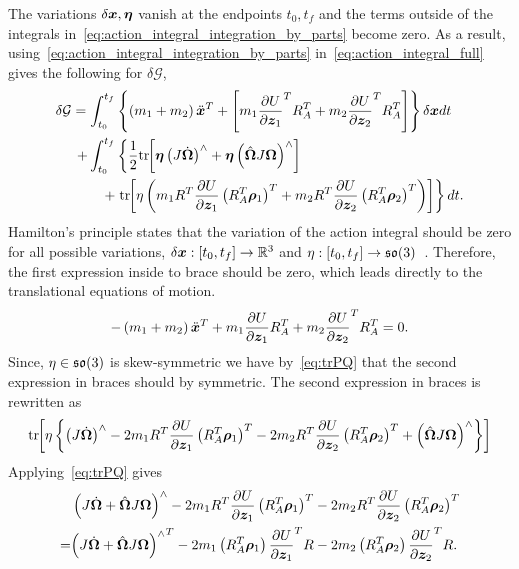 The variations \( \delta \bm{x}, \bm{\eta}\) vanish at the endpoints \( t_0, t_f \) and the terms outside of the integrals in~\cref{eq:action_integral_integration_by_parts} become zero.
As a result, using~\cref{eq:action_integral_integration_by_parts} in~\cref{eq:action_integral_full} gives the following for \( \delta \mathcal{G} \),
\begin{align}\label{eq:action_integral_stationary}
    \delta \mathcal{G} = \int_{t_0}^{t_f} & \left\{  \left( m_1 + m_2 \right) \ddot{\bm{x}}^T + \left[ m_1 \frac{\partial U}{\partial \bm{z}_1}^T R_A^T + m_2 \frac{\partial U}{\partial \bm{z}_2}^T R_A^T  \right] \right\} \delta\bm{x} dt \nonumber\\
    + \int_{t_0}^{t_f} &\left\{ \frac{1}{2} \mathrm{tr}\negthickspace\left[ \bm{\eta} \left( J \dot{\bm{\Omega}} \right)^\wedge + \bm{\eta} \left( \hat{\bm{\Omega}} J \bm{\Omega} \right)^\wedge  \right] \right. \nonumber \\
    + & \left.  \mathrm{tr}\negthickspace\left[  \eta \left( m_1 R^T \frac{\partial U}{\partial \bm{z}_1} \left( R_A^T \bm{\rho}_1 \right)^T + m_2 R^T \frac{\partial U}{\partial \bm{z}_2} \left( R_A^T \bm{\rho}_2 \right)^T \right) \right] \right\} dt.
\end{align}
Hamilton's principle states that the variation of the action integral should be zero for all possible variations, \( \delta \bm{x} : \left[ t_0, t_f \right] \to \mathbb{R}^3 \) and \( \eta : \left[ t_0, t_f \right] \to \mathfrak{so}(3) \)~\cite{lanczos1970}.
Therefore, the first expression inside to brace should be zero, which leads directly to the translational equations of motion.
\begin{align}\label{eq:translational_eoms}
    -\left( m_1 +m_2 \right) \ddot{\bm{x}}^T + m_1 \frac{\partial U}{\partial \bm{z}_1} R_A^T + m_2 \frac{\partial U}{\partial \bm{z}_2}^T R_A^T = 0 .
\end{align}
Since, \( \eta \in \mathfrak{so}(3) \) is skew-symmetric we have by~\cref{eq:trPQ} that the second expression in braces should by symmetric.
The second expression in braces is rewritten as
\begin{align}
    \mathrm{tr}\negthickspace\left[  \eta \left\{  \left(  J \dot{\bm{\Omega}} \right)^\wedge - 2 m_1 R^T \frac{\partial U}{\partial \bm{z}_1} \left( R_A^T \bm{\rho}_1 \right)^T - 2 m_2 R^T \frac{\partial U}{\partial \bm{z}_2} \left( R_A^T \bm{\rho}_2 \right)^T + \left( \hat{\bm{\Omega}}J \bm{\Omega}  \right)^\wedge  \right\} \right] \nonumber\\
\end{align}
Applying~\cref{eq:trPQ} gives
\begin{align}
    &\left( J \dot{\bm{\Omega}} + \hat{\bm{\Omega}} J \bm{\Omega} \right)^\wedge - 2 m_1 R^T \frac{\partial U}{\partial \bm{z}_1} \left( R_A^T \bm{\rho}_1 \right)^T - 2 m_2 R^T \frac{\partial U}{\partial \bm{z}_2} \left( R_A^T \bm{\rho}_2 \right)^T \nonumber\\
    =& {\left( J \dot{\bm{\Omega}} + \hat{\bm{\Omega}}  J \bm{\Omega} \right)^{\wedge}}^T - 2 m_1 \left( R_A^T \bm{\rho}_1 \right) \frac{\partial U}{\partial \bm{z}_1}^T R  - 2 m_2 \left( R_A^T \bm{\rho}_2 \right) \frac{\partial U}{\partial \bm{z}_2}^T R .
\end{align}
